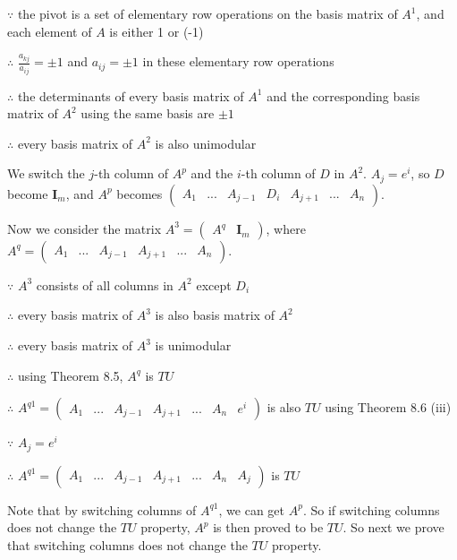 $\because$ the pivot is a set of elementary row operations on the basis matrix of $A^1$, and each element of $A$ is either 1 or (-1)

$\therefore$ $\frac{a_{kj}}{a_{ij}}=\pm1$ and $a_{ij}=\pm1$ in these elementary row operations

$\therefore$ the determinants of every basis matrix of $A^1$ and the corresponding basis matrix of $A^2$ using the same basis are $\pm1$

$\therefore$ every basis matrix of $A^2$ is also unimodular

We switch the $j$-th column of $A^p$ and the $i$-th column of $D$ in $A^2$. $A_j=e^i$, so $D$ become $\textbf{I}_m$, and $A^p$ becomes $\left(\begin{array}{ccccccc} A_1 & ... & A_{j-1} & D_i & A_{j+1} & ... & A_n \end{array}\right)$. 

Now we consider the matrix $A^3=\left( \begin{array}{cc} A^q & \textbf{I}_m \end{array}\right)$, where $A^q=\left(\begin{array}{cccccc} A_1 & ... & A_{j-1} & A_{j+1} & ... & A_n \end{array}\right)$.

$\because$ $A^3$ consists of all columns in $A^2$ except $D_i$

$\therefore$ every basis matrix of $A^3$ is also basis matrix of $A^2$

$\therefore$ every basis matrix of $A^3$ is unimodular

$\therefore$ using Theorem 8.5, $A^q$ is $TU$

$\therefore$ $A^{q1}=\left(\begin{array}{ccccccc} A_1 & ... & A_{j-1} & A_{j+1} & ... & A_n & e^i \end{array}\right)$ is also $TU$ using Theorem 8.6 (iii)

$\because$ $A_j=e^i$

$\therefore$  $A^{q1}=\left(\begin{array}{ccccccc} A_1 & ... & A_{j-1} & A_{j+1} & ... & A_n & A_j \end{array}\right)$ is $TU$

Note that by switching columns of $A^{q1}$, we can get $A^p$. So if switching columns does not change the $TU$ property, $A^p$ is then proved to be $TU$. So next we prove that switching columns does not change the $TU$ property.


